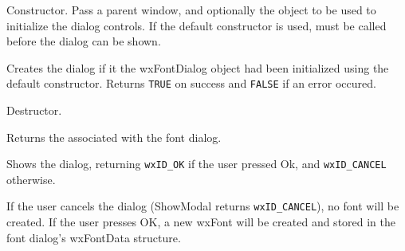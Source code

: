 


Constructor. Pass a parent window, and optionally the 
 object to be used to initialize the dialog
controls. If the default constructor is used, 
 must be called before the dialog can be
shown.

\label{wxfontdialogcreate}




Creates the dialog if it the wxFontDialog object had been initialized using the
default constructor. Returns {\tt TRUE} on success and {\tt FALSE} if an error
occured.



Destructor.




Returns the  associated with the font dialog.



Shows the dialog, returning {\tt wxID\_OK} if the user pressed Ok, and 
{\tt wxID\_CANCEL} otherwise.

If the user cancels the dialog (ShowModal returns {\tt wxID\_CANCEL}), no font
will be created. If the user presses OK, a new wxFont will be created and
stored in the font dialog's wxFontData structure.

